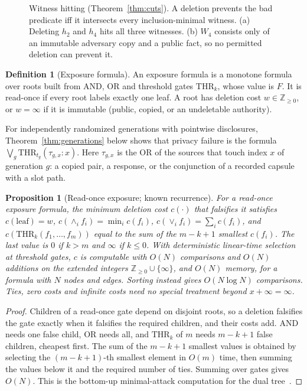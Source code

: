 \documentclass[pdflatex,sn-mathphys-num,twocolumn]{sn-jnl}
\theoremstyle{plain}
\newtheorem{proposition}[theorem]{Proposition}
\theoremstyle{definition}
\newtheorem{definition}[theorem]{Definition}
\begin{document}
\begin{figure}[t]
\centering
\resizebox{\linewidth}{!}{}
\caption{Witness hitting (Theorem~\ref{thm:cuts}). A deletion prevents the bad predicate iff it intersects every inclusion-minimal witness. (a) Deleting $h_2$ and $h_4$ hits all three witnesses. (b) $W_4$ consists only of an immutable adversary copy and a public fact, so no permitted deletion can prevent it.}\label{fig:witness}
\end{figure}

\begin{definition}[Exposure formula]
An exposure formula is a monotone formula over roots built from AND, OR and threshold gates $\mathrm{THR}_k$, whose value is $F$. It is read-once if every root labels exactly one leaf. A root has deletion cost $w\in\mathbb{Z}_{\ge0}$, or $w=\infty$ if it is immutable (public, copied, or an undeletable authority).
\end{definition}

For independently randomized generations with pointwise disclosures, Theorem~\ref{thm:generations} below shows that privacy failure is the formula $\bigvee_g\mathrm{THR}_{t_g}(\tau_{g,x}:x)$. Here $\tau_{g,x}$ is the OR of the sources that touch index $x$ of generation $g$: a copied pair, a response, or the conjunction of a recorded capsule with a slot path.

\begin{proposition}[Read-once exposure; known recurrence]\label{prop:readonce}
For a read-once exposure formula, the minimum deletion cost $c(\cdot)$ that falsifies it satisfies $c(\text{leaf})=w$, $c(\wedge_i f_i)=\min_i c(f_i)$, $c(\vee_i f_i)=\sum_i c(f_i)$, and $c(\mathrm{THR}_k(f_1,\dots,f_m))$ equal to the sum of the $m-k+1$ smallest $c(f_i)$. The last value is $0$ if $k>m$ and $\infty$ if $k\le0$. With deterministic linear-time selection~\cite{blum1973} at threshold gates, $c$ is computable with $O(N)$ comparisons and $O(N)$ additions on the extended integers $\mathbb{Z}_{\ge0}\cup\{\infty\}$, and $O(N)$ memory, for a formula with $N$ nodes and edges. Sorting instead gives $O(N\log N)$ comparisons. Ties, zero costs and infinite costs need no special treatment beyond $x+\infty=\infty$.
\end{proposition}
\begin{proof}
Children of a read-once gate depend on disjoint roots, so a deletion falsifies the gate exactly when it falsifies the required children, and their costs add. AND needs one false child, OR needs all, and $\mathrm{THR}_k$ of $m$ needs $m-k+1$ false children, cheapest first. The sum of the $m-k+1$ smallest values is obtained by selecting the $(m-k+1)$-th smallest element in $O(m)$ time, then summing the values below it and the required number of ties. Summing over gates gives $O(N)$. This is the bottom-up minimal-attack computation for the dual tree~\cite{mauw2005,lopuhaa2022}.
\end{proof}
\end{document}
